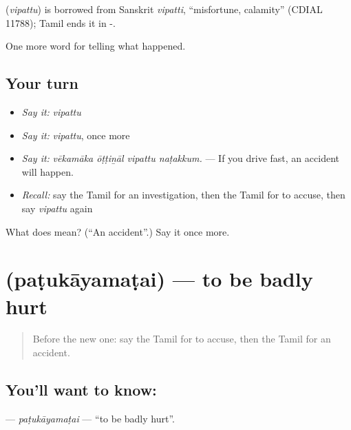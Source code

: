\begin{cousinweb}
\textbf{} (\emph{vipattu}) is borrowed from Sanskrit \emph{vipatti}, \textquotedblleft{}misfortune, calamity\textquotedblright{} (CDIAL 11788); Tamil ends it in -.
\end{cousinweb}

\begin{grammarlens}[title={What you've built}]
One more word for telling what happened.
\end{grammarlens}

\subsection*{Your turn}
\begin{itemize}
\raggedright
  \item \emph{Say it:} \emph{vipattu}
  \item \emph{Say it:} \emph{vipattu}, once more
  \item \emph{Say it:} \emph{vēkamāka ōṭṭiṉāl vipattu naṭakkum.} — If you drive fast, an accident will happen.
  \item \emph{Recall:} say the Tamil for an investigation, then the Tamil for to accuse, then say \emph{vipattu} again
\end{itemize}

\begin{tcolorbox}[breakable,colback=teal!4,colframe=teal!35!black,title={Before you move on}]
What does  mean? (\textquotedblleft{}An accident\textquotedblright{}.) Say it once more.
\end{tcolorbox}
\section[\texorpdfstring{\ta{படுகாயமடை} (paṭukāyamaṭai)}{படுகாயமடை (paṭukāyamaṭai)}]{ (paṭukāyamaṭai) — to be badly hurt}

\label{lesson:TA-C298-patukayamatai}



\begin{quote}
Before the new one: say the Tamil for to accuse, then the Tamil for an accident.
\end{quote}

\subsection*{You'll want to know: }
\textbf{} — \emph{paṭukāyamaṭai} — \textquotedblleft{}to be badly hurt\textquotedblright{}.

